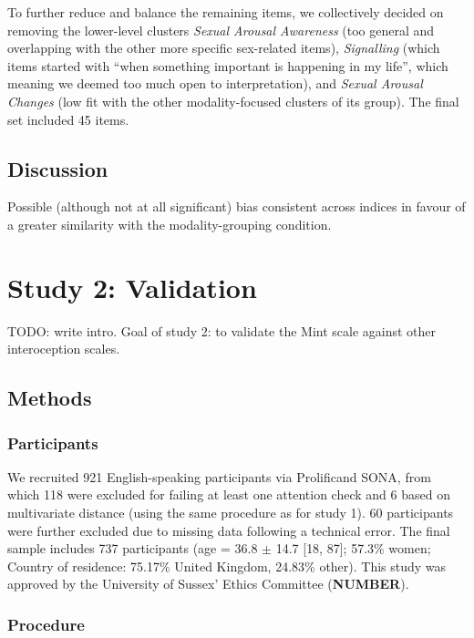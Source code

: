 \documentclass[
  jou,
  floatsintext,
  longtable,
  nolmodern,
  notxfonts,
  notimes,
  colorlinks=true,linkcolor=blue,citecolor=blue,urlcolor=blue]{apa7}
\begin{document}
To further reduce and balance the remaining items, we collectively
decided on removing the lower-level clusters \emph{Sexual Arousal
Awareness} (too general and overlapping with the other more specific
sex-related items), \emph{Signalling} (which items started with ``when
something important is happening in my life'', which meaning we deemed
too much open to interpretation), and \emph{Sexual Arousal Changes} (low
fit with the other modality-focused clusters of its group). The final
set included 45 items.

\subsection{Discussion}\label{discussion}

Possible (although not at all significant) bias consistent across
indices in favour of a greater similarity with the modality-grouping
condition.

\section{Study 2: Validation}\label{study-2-validation}

TODO: write intro. Goal of study 2: to validate the Mint scale against
other interoception scales.

\subsection{Methods}\label{methods-1}

\subsubsection{Participants}\label{participants-1}

We recruited 921 English-speaking participants via
Prolific\textcopyright and SONA, from which 118 were excluded for
failing at least one attention check and 6 based on multivariate
distance (using the same procedure as for study 1). 60 participants were
further excluded due to missing data following a technical error. The
final sample includes 737 participants (age = 36.8 \(\pm\) 14.7 {[}18,
87{]}; 57.3\% women; Country of residence: 75.17\% United Kingdom,
24.83\% other). This study was approved by the University of Sussex'
Ethics Committee (\textbf{NUMBER}).

\subsubsection{Procedure}\label{procedure-1}
\end{document}
